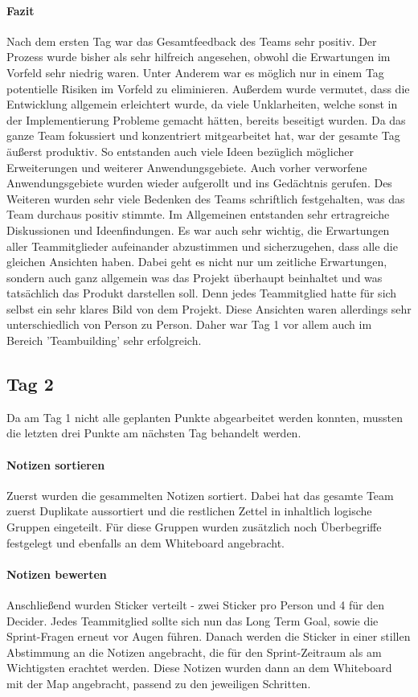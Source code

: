 \paragraph{Fazit}
Nach dem ersten Tag war das Gesamtfeedback des Teams sehr positiv. Der Prozess wurde bisher als sehr hilfreich angesehen, obwohl die Erwartungen im Vorfeld sehr niedrig waren. Unter Anderem war es möglich nur in einem Tag potentielle Risiken im Vorfeld zu eliminieren. Außerdem wurde vermutet, dass die Entwicklung allgemein erleichtert wurde, da viele Unklarheiten, welche sonst in der Implementierung Probleme gemacht hätten, bereits beseitigt wurden. Da das ganze Team fokussiert und konzentriert mitgearbeitet hat, war der gesamte Tag äußerst produktiv. So entstanden auch viele Ideen bezüglich möglicher Erweiterungen und weiterer Anwendungsgebiete. Auch vorher verworfene Anwendungsgebiete wurden wieder aufgerollt und ins Gedächtnis gerufen. Des Weiteren wurden sehr viele Bedenken des Teams schriftlich festgehalten, was das Team durchaus positiv stimmte. Im Allgemeinen entstanden sehr ertragreiche Diskussionen und Ideenfindungen. Es war auch sehr wichtig, die Erwartungen aller Teammitglieder aufeinander abzustimmen und sicherzugehen, dass alle die gleichen Ansichten haben. Dabei geht es nicht nur um zeitliche Erwartungen, sondern auch ganz allgemein was das Projekt überhaupt beinhaltet und was tatsächlich das Produkt darstellen soll. Denn jedes Teammitglied hatte für sich selbst ein sehr klares Bild von dem Projekt. Diese Ansichten waren allerdings sehr unterschiedlich von Person zu Person. Daher war Tag 1 vor allem auch im Bereich 'Teambuilding' sehr erfolgreich.

\subsection*{Tag 2}
Da am Tag 1 nicht alle geplanten Punkte abgearbeitet werden konnten, mussten die letzten drei Punkte am nächsten Tag behandelt werden.

\paragraph{Notizen sortieren}
Zuerst wurden die gesammelten Notizen sortiert. Dabei hat das gesamte Team zuerst Duplikate aussortiert und die restlichen Zettel in inhaltlich logische Gruppen eingeteilt. Für diese Gruppen wurden zusätzlich noch Überbegriffe festgelegt und ebenfalls an dem Whiteboard angebracht.

\paragraph{Notizen bewerten}
Anschließend wurden Sticker verteilt - zwei Sticker pro Person und 4 für den Decider. Jedes Teammitglied sollte sich nun das Long Term Goal, sowie die Sprint-Fragen erneut vor Augen führen. Danach werden die Sticker in einer stillen Abstimmung an die Notizen angebracht, die für den Sprint-Zeitraum als am Wichtigsten erachtet werden. Diese Notizen wurden dann an dem Whiteboard mit der Map angebracht, passend zu den jeweiligen Schritten.

